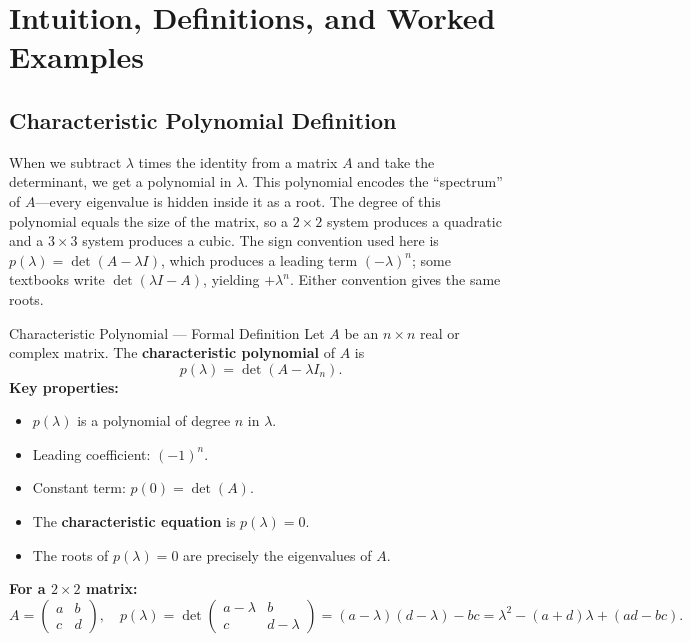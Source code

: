 \documentclass[12pt,a4paper]{article}
\begin{document}
\section{Intuition, Definitions, and Worked Examples}

\subsection{Characteristic Polynomial Definition}

When we subtract $\lambda$ times the identity from a matrix $A$ and take the determinant,
we get a polynomial in $\lambda$. This polynomial encodes the ``spectrum'' of $A$---every
eigenvalue is hidden inside it as a root. The degree of this polynomial equals the size of
the matrix, so a $2\times 2$ system produces a quadratic and a $3\times 3$ system produces
a cubic. The sign convention used here is $p(\lambda)=\det(A-\lambda I)$, which produces a
leading term $(-\lambda)^n$; some textbooks write $\det(\lambda I - A)$, yielding $+\lambda^n$.
Either convention gives the same roots.

\begin{infobox}{Characteristic Polynomial --- Formal Definition}
Let $A$ be an $n\times n$ real or complex matrix. The \textbf{characteristic polynomial} of $A$ is
\[
  p(\lambda) = \det(A - \lambda I_n).
\]
\textbf{Key properties:}
\begin{itemize}[leftmargin=*]
  \item $p(\lambda)$ is a polynomial of degree $n$ in $\lambda$.
  \item Leading coefficient: $(-1)^n$.
  \item Constant term: $p(0) = \det(A)$.
  \item The \textbf{characteristic equation} is $p(\lambda) = 0$.
  \item The roots of $p(\lambda)=0$ are precisely the eigenvalues of $A$.
\end{itemize}
\textbf{For a $2\times 2$ matrix:}
\[
  A = \begin{pmatrix} a & b \\ c & d \end{pmatrix}, \quad
  p(\lambda) = \det\begin{pmatrix} a-\lambda & b \\ c & d-\lambda \end{pmatrix}
             = (a-\lambda)(d-\lambda) - bc
             = \lambda^2 - (a+d)\lambda + (ad-bc).
\]
\end{infobox}
\end{document}
